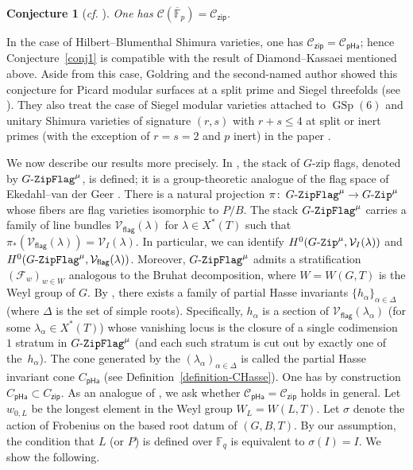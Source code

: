 \documentclass[11pt]{amsart}
\numberwithin{equation}{section}
\newtheorem{conjIntro}{Conjecture}
\theoremstyle{definition}
\theoremstyle{remark}
\newcommand{\GZip}{\mathop{\text{$G$-{\tt Zip}}}\nolimits}
\newcommand{\pha}{\mathsf{pHa}}
\newcommand{\zipsf}{\mathsf{zip}}
\newcommand{\flag}{\mathsf{flag}}
\newcommand{\GF}{\mathop{\text{$G$-{\tt ZipFlag}}}\nolimits}
\newcommand{\Ccal}{{\mathcal C}}
\newcommand{\Fcal}{{\mathcal F}}
\newcommand{\Vcal}{{\mathcal V}}
\newcommand{\FF}{\mathbb{F}}
\DeclareMathOperator{\GSp}{GSp}
\begin{document}
\begin{conjIntro}[\textit{cf.} {\cite[Conjecture 2.1.6]{Goldring-Koskivirta-global-sections-compositio}}]\label{conj2}
One has $\Ccal(\overline{\FF}_p) = \Ccal_{\zipsf}$.
\end{conjIntro}

In the case of Hilbert--Blumenthal Shimura varieties, one has $\Ccal_{\zipsf} = \Ccal_{\pha}$; hence Conjecture~\ref{conj1} is compatible with the result of Diamond--Kassaei mentioned above. Aside from this case, Goldring and the second-named author showed this conjecture for Picard modular surfaces at a split prime and Siegel threefolds (see \cite[Theorem D]{Goldring-Koskivirta-global-sections-compositio}). They also treat the case of Siegel modular varieties attached to $\GSp(6)$ and unitary Shimura varieties of signature $(r,s)$ with $r+s\leq 4$ at split or inert primes (with the exception of $r=s=2$ and $p$ inert) in the paper \cite{Goldring-Koskivirta-divisibility}. 

We now describe our results more precisely. In \cite{Goldring-Koskivirta-Strata-Hasse}, the stack of $G$-zip flags, denoted by $\GF^\mu$, is defined; it is a group-theoretic analogue of the flag space of Ekedahl--van der Geer \cite{Ekedahl-Geer-EO}. There is a natural projection 
$\pi\colon \GF^\mu\to \GZip^\mu$ 
whose fibers are flag varieties isomorphic to $P/B$. The stack $\GF^\mu$ carries a family of line bundles $\Vcal_{\flag}(\lambda)$ for $\lambda\in X^*(T)$ such that $\pi_*(\Vcal_{\flag}(\lambda))=\Vcal_I(\lambda)$. In particular, we can identify $H^0(\GZip^\mu,\Vcal_I(\lambda))$ and $H^0(\GF^\mu,\Vcal_{\flag}(\lambda))$. Moreover, $\GF^\mu$ admits a stratification $(\Fcal_w)_{w\in W}$ analogous to the Bruhat decomposition, where $W=W(G,T)$ is the Weyl group of $G$. By \cite{Imai-Koskivirta-partial-Hasse}, there exists a family of partial Hasse invariants $\{h_\alpha\}_{\alpha \in \Delta}$ (where $\Delta$ is the set of simple roots). Specifically, $h_\alpha$ is a section of $\Vcal_{\flag}(\lambda_\alpha)$ (for some $\lambda_\alpha\in X^*(T)$) whose vanishing locus is the closure of a single codimension~$1$ stratum in $\GF^\mu$ (and each such stratum is cut out by exactly one of the~$h_{\alpha}$). The cone generated by the $(\lambda_\alpha)_{\alpha\in \Delta}$ is called the partial Hasse invariant cone $C_{\pha}$ (see Definition~\ref{definition-CHasse}). One has by construction $C_{\pha}\subset C_{\zipsf}$. As an analogue of \cite[Corollary 8.3]{Diamond-Kassaei-cone-minimal}, we ask whether $\Ccal_{\pha} = \Ccal_{\zipsf}$ holds in general. 
Let $w_{0,L}$ be the longest element in the Weyl group $W_L=W(L,T)$. Let $\sigma$ denote the action of Frobenius on the based root datum of $(G,B,T)$. By our assumption, the condition that $L$ (or $P$) is defined over $\FF_q$ is equivalent to $\sigma(I)=I$. We show the following. 
\end{document}
